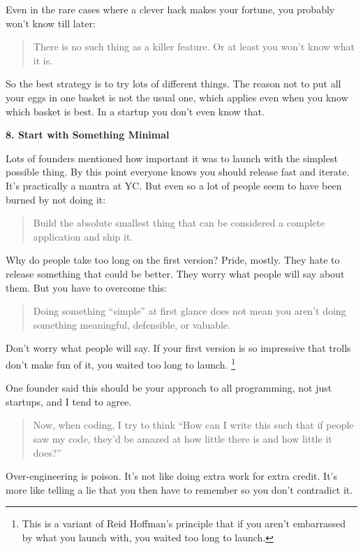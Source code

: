 Even in the rare cases where a clever hack makes your fortune, you
probably won't know till later:

\begin{quote}
There is no such thing as a killer feature. Or at least you won't know
what it is.
\end{quote}

So the best strategy is to try lots of different things. The reason not
to put all your eggs in one basket is not the usual one, which applies
even when you know which basket is best. In a startup you don't even
know that.

\textbf{8. Start with Something Minimal}

Lots of founders mentioned how important it was to launch with the
simplest possible thing. By this point everyone knows you should release
fast and iterate. It's practically a mantra at YC. But even so a lot of
people seem to have been burned by not doing it:

\begin{quote}
Build the absolute smallest thing that can be considered a complete
application and ship it.
\end{quote}

Why do people take too long on the first version? Pride, mostly. They
hate to release something that could be better. They worry what people
will say about them. But you have to overcome this:

\begin{quote}
Doing something ``simple'' at first glance does not mean you aren't
doing something meaningful, defensible, or valuable.
\end{quote}

Don't worry what people will say. If your first version is so impressive
that trolls don't make fun of it, you waited too long to launch.
\footnote{This is a variant of Reid Hoffman's principle that if you aren't
embarrassed by what you launch with, you waited too long to launch.}

One founder said this should be your approach to all programming, not
just startups, and I tend to agree.

\begin{quote}
Now, when coding, I try to think ``How can I write this such that if
people saw my code, they'd be amazed at how little there is and how
little it does?''
\end{quote}

Over-engineering is poison. It's not like doing extra work for extra
credit. It's more like telling a lie that you then have to remember so
you don't contradict it.

